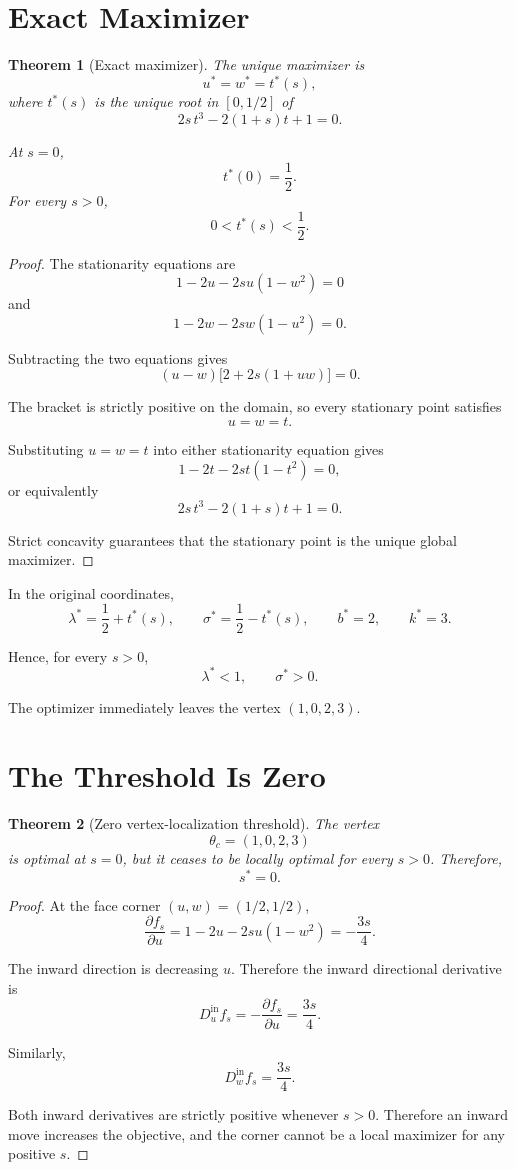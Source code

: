 \documentclass[11pt]{article}
\newtheorem{theorem}{Theorem}[section]
\theoremstyle{remark}
\begin{document}
\section{Exact Maximizer}

\begin{theorem}[Exact maximizer]
The unique maximizer is
\[
u^*=w^*=t^*(s),
\]
where $t^*(s)$ is the unique root in $[0,1/2]$ of
\[
2s\,t^3-2(1+s)t+1=0.
\]

At $s=0$,
\[
t^*(0)=\frac12.
\]
For every $s>0$,
\[
0<t^*(s)<\frac12.
\]
\end{theorem}

\begin{proof}
The stationarity equations are
\[
1-2u-2su(1-w^2)=0
\]
and
\[
1-2w-2sw(1-u^2)=0.
\]

Subtracting the two equations gives
\[
(u-w)\bigl[2+2s(1+uw)\bigr]=0.
\]

The bracket is strictly positive on the domain, so every stationary point
satisfies
\[
u=w=t.
\]

Substituting $u=w=t$ into either stationarity equation gives
\[
1-2t-2st(1-t^2)=0,
\]
or equivalently
\[
2s\,t^3-2(1+s)t+1=0.
\]

Strict concavity guarantees that the stationary point is the unique global
maximizer.
\end{proof}

In the original coordinates,
\[
\lambda^*=\frac12+t^*(s),
\qquad
\sigma^*=\frac12-t^*(s),
\qquad
b^*=2,
\qquad
k^*=3.
\]

Hence, for every $s>0$,
\[
\lambda^*<1,
\qquad
\sigma^*>0.
\]

The optimizer immediately leaves the vertex $(1,0,2,3)$.

\section{The Threshold Is Zero}

\begin{theorem}[Zero vertex-localization threshold]
The vertex
\[
\theta_c=(1,0,2,3)
\]
is optimal at $s=0$, but it ceases to be locally optimal for every $s>0$. Therefore,
\[
\boxed{s^*=0}.
\]
\end{theorem}

\begin{proof}
At the face corner $(u,w)=(1/2,1/2)$,
\[
\frac{\partial f_s}{\partial u}
=
1-2u-2su(1-w^2)
=
-\frac{3s}{4}.
\]

The inward direction is decreasing $u$. Therefore the inward directional
derivative is
\[
D_u^{\mathrm{in}}f_s
=
-\frac{\partial f_s}{\partial u}
=
\frac{3s}{4}.
\]

Similarly,
\[
D_w^{\mathrm{in}}f_s=\frac{3s}{4}.
\]

Both inward derivatives are strictly positive whenever $s>0$. Therefore an
inward move increases the objective, and the corner cannot be a local
maximizer for any positive $s$.
\end{proof}
\end{document}
